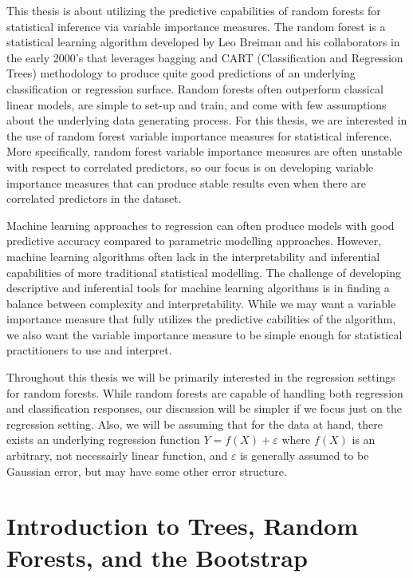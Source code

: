 \documentclass[12pt,twoside]{reedthesis}
\theoremstyle{definition}
\theoremstyle{definition}
\theoremstyle{definition}
\theoremstyle{remark}
\begin{document}
This thesis is about utilizing the predictive capabilities of random
forests for statistical inference via variable importance measures. The
random forest is a statistical learning algorithm developed by Leo
Breiman and his collaborators in the early 2000's that leverages bagging
and CART (Classification and Regression Trees) methodology to produce
quite good predictions of an underlying classification or regression
surface. Random forests often outperform classical linear models, are
simple to set-up and train, and come with few assumptions about the
underlying data generating process. For this thesis, we are interested
in the use of random forest variable importance measures for statistical
inference. More specifically, random forest variable importance measures
are often unstable with respect to correlated predictors, so our focus
is on developing variable importance measures that can produce stable
results even when there are correlated predictors in the dataset. \par

Machine learning approaches to regression can often produce models with
good predictive accuracy compared to parametric modelling approaches.
However, machine learning algorithms often lack in the interpretability
and inferential capabilities of more traditional statistical modelling.
The challenge of developing descriptive and inferential tools for
machine learning algorithms is in finding a balance between complexity
and interpretability. While we may want a variable importance measure
that fully utilizes the predictive cabilities of the algorithm, we also
want the variable importance measure to be simple enough for statistical
practitioners to use and interpret. \par

Throughout this thesis we will be primarily interested in the regression
settings for random forests. While random forests are capable of
handling both regression and classification responses, our discussion
will be simpler if we focus just on the regression setting. Also, we
will be assuming that for the data at hand, there exists an underlying
regression function \(Y=f(X)+\varepsilon\) where \(f(X)\) is an
arbitrary, not necessairly linear function, and \(\varepsilon\) is
generally assumed to be Gaussian error, but may have some other error
structure. \par

\chapter{Introduction to Trees, Random Forests, and the
Bootstrap}\label{rmd-basics}
\end{document}

